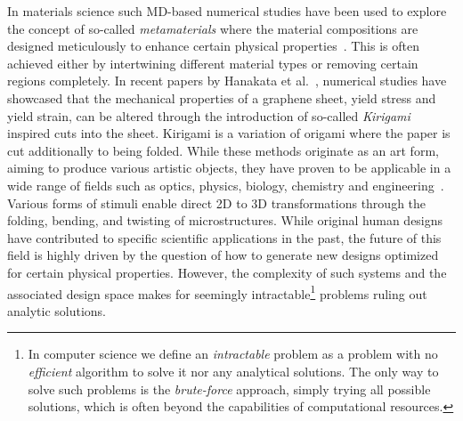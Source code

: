 In materials science such \acrshort{MD}-based numerical studies have been used
to explore the concept of so-called \textit{metamaterials} where the material
compositions are designed meticulously to enhance certain physical
properties~\mbox{\cite{PhysRevLett.121.255304, PhysRevResearch.2.042006,
graphene/hBN, Mao, Yang, Forte}}. This is often achieved either by intertwining
different material types or removing certain regions completely. In recent
papers by Hanakata et al.~\cite{PhysRevLett.121.255304,
PhysRevResearch.2.042006}, numerical studies have showcased that the mechanical
properties of a graphene sheet, yield stress and yield strain, can be altered
through the introduction of so-called \textit{Kirigami} inspired cuts into the
sheet. Kirigami is a variation of origami where the paper is cut additionally to
being folded. While these methods originate as an art form, aiming to produce
various artistic objects, they have proven to be applicable in a wide range of
fields such as optics, physics, biology, chemistry and
engineering~\cite{chen_kirigamiorigami_2020}. Various forms of stimuli enable
direct 2D to 3D transformations through the folding, bending, and twisting of
microstructures. While original human designs have contributed to specific
scientific applications in the past, the future of this field is highly driven
by the question of how to generate new designs optimized for certain physical
properties. However, the complexity of such systems and the associated design
space makes for seemingly intractable\footnote{In computer science we define an
\textit{intractable} problem as a problem with no \textit{efficient} algorithm
to solve it nor any analytical solutions. The only way to solve such problems is
the \textit{brute-force} approach, simply trying all possible solutions, which
is often beyond the capabilities of computational resources.} problems ruling
out analytic solutions.

